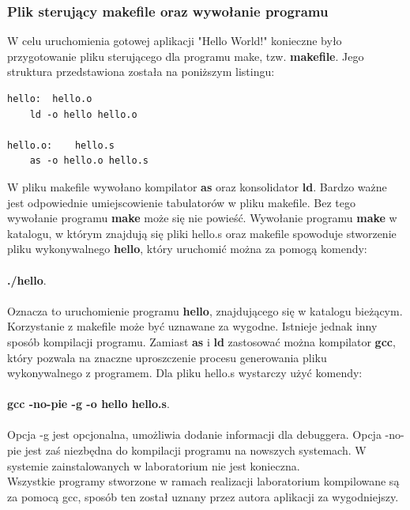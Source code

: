 \documentclass[a4paper,12pt]{article}
\begin{document}
\subsubsection{Plik sterujący makefile oraz wywołanie programu}
W celu uruchomienia gotowej aplikacji "Hello World!" konieczne było przygotowanie pliku sterującego dla programu make, tzw. \textbf{makefile}. Jego struktura przedstawiona została na poniższym listingu:
\begin{verbatim}
hello:	hello.o
	ld -o hello hello.o

hello.o:	hello.s
	as -o hello.o hello.s
\end{verbatim}
W pliku makefile wywołano kompilator \textbf{as} oraz konsolidator \textbf{ld}. Bardzo ważne jest odpowiednie umiejscowienie tabulatorów w pliku makefile. Bez tego wywołanie programu \textbf{make} może się nie powieść.  Wywołanie programu \textbf{make} w katalogu, w którym znajdują się pliki hello.s oraz makefile spowoduje stworzenie pliku wykonywalnego \textbf{hello}, który uruchomić można za pomogą komendy:\\\\ \textbf{./hello}.\\\\ Oznacza to uruchomienie programu \textbf{hello}, znajdującego się w katalogu bieżącym.\\
Korzystanie z makefile może być uznawane za wygodne. Istnieje jednak inny sposób kompilacji programu. Zamiast \textbf{as} i \textbf{ld} zastosować można kompilator \textbf{gcc}, który pozwala na znaczne uproszczenie procesu generowania pliku wykonywalnego z programem. Dla pliku hello.s wystarczy użyć komendy:\\\\
\textbf{gcc -no-pie -g -o hello hello.s}.\\\\
Opcja -g jest opcjonalna, umożliwia dodanie informacji dla debuggera. Opcja -no-pie jest zaś niezbędna do kompilacji programu na nowszych systemach. W systemie zainstalowanych w laboratorium nie jest konieczna.\\
Wszystkie programy stworzone w ramach realizacji laboratorium kompilowane są za pomocą gcc, sposób ten został uznany przez autora aplikacji za wygodniejszy.
\end{document}
